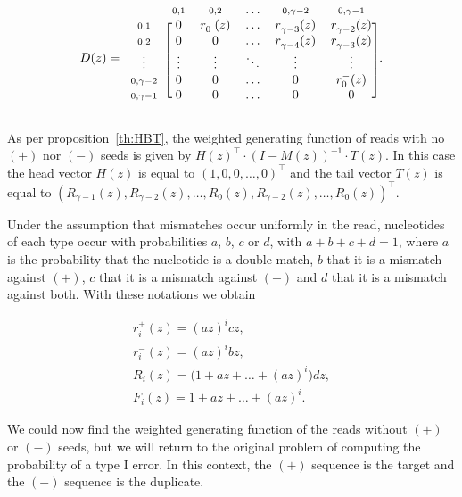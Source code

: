 \documentclass{article}
\begin{document}
\begin{equation*}
D(z) = 
\begin{blockarray}{cccccc}
   & \scriptstyle{0,1} & \scriptstyle{0,2} & \ldots &
    \scriptstyle{0,\gamma-2} & \scriptstyle{0,\gamma-1} \\
\begin{block}{c[ccccc]}
\scriptstyle{0,1} & 0 & r_0^-(z) & \ldots &
    r_{\gamma-3}^-(z) & r_{\gamma-2}^-(z) \\
\scriptstyle{0,2} & 0 & 0 & \ldots &
    r_{\gamma-4}^-(z) & r_{\gamma-3}^-(z) \\
\vdots & \vdots & \vdots & \ddots & \vdots & \vdots \\
\scriptstyle{0,\gamma-2} & 0 & 0 & \ldots & 0 & r_0^-(z) \\
\scriptstyle{0,\gamma-1} & 0 & 0 & \ldots & 0 & 0 \\
\end{block}
\end{blockarray}.
\end{equation*}


As per proposition~\ref{th:HBT}, the weighted generating function of reads
with no $(+)$ nor $(-)$ seeds is given by $H(z)^\top \cdot (I-M(z))^{-1}
\cdot T(z)$. In this case the head vector $H(z)$ is equal to
$(1,0,0,\ldots,0)^\top$ and the tail vector $T(z)$ is equal to
$(R_{\gamma-1}(z), R_{\gamma-2}(z), \ldots, R_0(z), R_{\gamma-2}(z),
\ldots, R_0(z))^\top$.

Under the assumption that mismatches occur uniformly in the read,
nucleotides of each type occur with probabilities $a$, $b$, $c$ or $d$,
with $a+b+c+d=1$, where $a$ is the probability that the nucleotide is a
double match, $b$ that it is a mismatch against $(+)$, $c$ that it is a
mismatch against $(-)$ and $d$ that it is a mismatch against both. With
these notations we obtain

\begin{equation}
\label{eq:abcd}
\begin{gathered}
r_i^+(z) = (az)^icz, \\
r_i^-(z) = (az)^ibz, \\
R_i(z) = \big( 1 + az + \ldots + (az)^i \big)dz, \\
F_i(z) = 1 + az + \ldots + (az)^i.
\end{gathered}
\end{equation}

We could now find the weighted generating function of the reads without
$(+)$ or $(-)$ seeds, but we will return to the original problem of
computing the probability of a type I error. In this context, the $(+)$
sequence is the target and the $(-)$ sequence is the duplicate.
\end{document}
